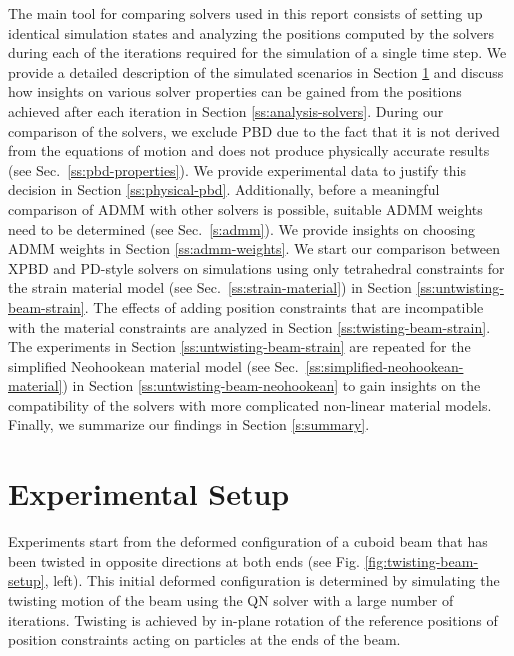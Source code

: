 The main tool for comparing solvers used in this report consists of setting up identical simulation states and analyzing the positions computed by the solvers during 
each of the iterations required for the simulation of a single time step. We provide a detailed description of the simulated scenarios in 
Section \ref{ss:experimental-setup} and discuss how insights on various solver properties can be gained from the positions achieved after each iteration in 
Section \ref{ss:analysis-solvers}. During our comparison of the solvers, we exclude PBD due to the fact that it is not derived from the equations of motion and does not produce 
physically accurate results (see Sec.\ \ref{ss:pbd-properties}). We provide experimental data to justify this decision in Section \ref{ss:physical-pbd}. Additionally, before a meaningful 
comparison of ADMM with other solvers is possible, suitable ADMM weights need to be determined (see Sec.\ \ref{s:admm}). We provide insights on choosing ADMM weights in Section \ref{ss:admm-weights}. 
We start our comparison between XPBD and PD-style solvers on simulations using only tetrahedral constraints for the strain material model (see Sec.\ \ref{ss:strain-material}) 
in Section \ref{ss:untwisting-beam-strain}. The effects of adding position constraints that are incompatible with the material constraints are analyzed in 
Section \ref{ss:twisting-beam-strain}. The experiments in Section \ref{ss:untwisting-beam-strain} are repeated for the simplified Neohookean material model (see 
Sec.\ \ref{ss:simplified-neohookean-material}) in Section \ref{ss:untwisting-beam-neohookean} to gain insights on the compatibility of the solvers with more complicated non-linear 
material models. Finally, we summarize our findings in Section \ref{s:summary}.

\section{Experimental Setup}\label{ss:experimental-setup}
Experiments start from the deformed configuration of a cuboid beam that has been twisted in opposite directions at both ends (see Fig. \ref{fig:twisting-beam-setup}, left).
This initial deformed configuration is determined by simulating the twisting motion of the beam using the QN solver with a large number of iterations. Twisting is achieved by 
in-plane rotation of the reference positions of position constraints acting on particles at the ends of the beam. 

